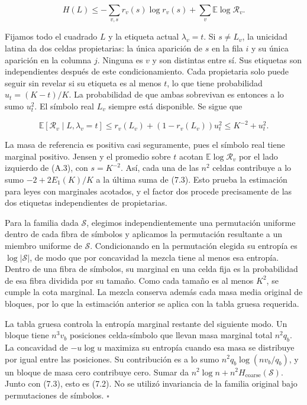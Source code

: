\documentclass[spanish,11pt,a4paper]{article}
\begin{document}
\nopagebreak[4]
\[H(L)\le-\sum_{v,s}r_v(s)\log r_v(s)
+\sum_v\mathbb E\log\mathcal R_v.\tag{7.3}\]

Fijamos todo el cuadrado \(L\) y la etiqueta actual \(\lambda_v=t\). Si \(s\ne L_v\), la unicidad latina da dos celdas propietarias: la única aparición de \(s\) en la fila \(i\) y su única aparición en la columna \(j\). Ninguna es \(v\) y son distintas entre sí. Sus etiquetas son independientes después de este condicionamiento. Cada propietaria solo puede seguir sin revelar si su etiqueta es al menos \(t\), lo que tiene probabilidad \(u_t=(K-t)/K\). La probabilidad de que ambas sobrevivan es entonces a lo sumo \(u_t^2\). El símbolo real \(L_v\) siempre está disponible. Se sigue que

\nopagebreak[4]
\[\mathbb E[\mathcal R_v\mid L,\lambda_v=t]
\le r_v(L_v)+(1-r_v(L_v))u_t^2
\le K^{-2}+u_t^2.\tag{7.3a}\]

La masa de referencia es positiva casi seguramente, pues el símbolo real tiene marginal positivo. Jensen y el promedio sobre \(t\) acotan \(\mathbb E\log\mathcal R_v\) por el lado izquierdo de (A.3), con \(s=K^{-2}\). Así, cada una de las \(n^2\) celdas contribuye a lo sumo \(-2+2E_1(K)/K\) a la última suma de (7.3). Esto prueba la estimación para leyes con marginales acotados, y el factor dos procede precisamente de las dos etiquetas independientes de propietarias.

Para la familia dada \(\mathcal S\), elegimos independientemente una permutación uniforme dentro de cada fibra de símbolos y aplicamos la permutación resultante a un miembro uniforme de \(\mathcal S\). Condicionando en la permutación elegida su entropía es \(\log|\mathcal S|\), de modo que por concavidad la mezcla tiene al menos esa entropía. Dentro de una fibra de símbolos, su marginal en una celda fija es la probabilidad de esa fibra dividida por su tamaño. Como cada tamaño es al menos \(K^2\), se cumple la cota marginal. La mezcla conserva además cada masa media original de bloques, por lo que la estimación anterior se aplica con la tabla gruesa requerida.

La tabla gruesa controla la entropía marginal restante del siguiente modo. Un bloque tiene \(n^3v_b\) posiciones celda-símbolo que llevan masa marginal total \(n^2q_b\). La concavidad de \(-u\log u\) maximiza su entropía cuando esa masa se distribuye por igual entre las posiciones. Su contribución es a lo sumo \(n^2q_b\log(nv_b/q_b)\), y un bloque de masa cero contribuye cero. Sumar da \(n^2\log n+n^2H_{\mathrm{coarse}}(\mathcal S)\). Junto con (7.3), esto es (7.2). No se utilizó invariancia de la familia original bajo permutaciones de símbolos. \(\square\)
\end{document}
